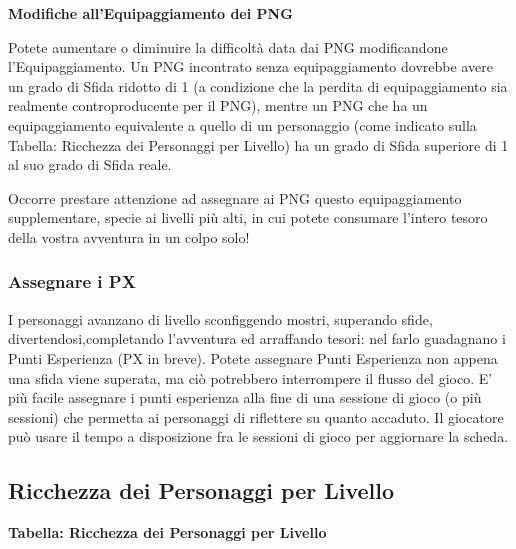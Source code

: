 \begin{multicols}{2}
\medskip

\textbf{Modifiche all'Equipaggiamento dei PNG}

Potete aumentare o diminuire la difficoltà data dai PNG modificandone l'Equipaggiamento. Un PNG incontrato senza equipaggiamento dovrebbe avere un grado di Sfida ridotto di 1 (a condizione che la perdita di equipaggiamento sia realmente controproducente per il PNG), mentre un PNG che ha un equipaggiamento equivalente a quello di un personaggio (come indicato sulla Tabella: Ricchezza dei Personaggi per Livello) ha un grado di Sfida superiore di 1 al suo grado di Sfida reale.

Occorre prestare attenzione ad assegnare ai PNG questo equipaggiamento supplementare, specie ai livelli più alti, in cui potete consumare l'intero tesoro della vostra avventura in un colpo solo!

\subsubsection{Assegnare i PX}\label{assegnarepuntiesperienza}

I personaggi avanzano di livello sconfiggendo mostri, superando sfide, divertendosi,completando l'avventura ed arraffando tesori: nel farlo guadagnano i Punti Esperienza (PX in breve). Potete assegnare Punti Esperienza non appena una sfida viene superata, ma ciò potrebbero interrompere il flusso del gioco. E' più facile assegnare i punti esperienza alla fine di una sessione di gioco (o più sessioni) che permetta ai personaggi di riflettere su quanto accaduto. Il giocatore può usare il tempo a disposizione fra le sessioni di gioco per aggiornare la scheda.


\subsection{Ricchezza dei Personaggi per Livello}

\textbf{Tabella: Ricchezza dei Personaggi per Livello}

\medskip


\end{multicols}
